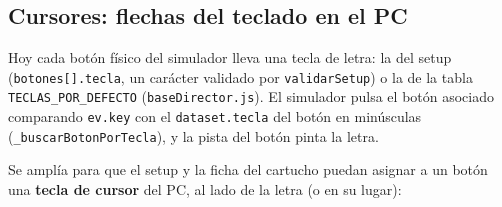 \subsection{Cursores: flechas del teclado en el PC}
\label{sec:F5I17Flechas}

Hoy cada botón físico del simulador lleva una tecla de letra: la del setup (\texttt{botones[].tecla}, un carácter validado por \texttt{validarSetup}) o la de la tabla \texttt{TECLAS\_POR\_DEFECTO} (\texttt{baseDirector.js}). El simulador pulsa el botón asociado comparando \texttt{ev.key} con el \texttt{dataset.tecla} del botón en minúsculas (\texttt{\_buscarBotonPorTecla}), y la pista del botón pinta la letra.

Se amplía para que el setup y la ficha del cartucho puedan asignar a un botón una \textbf{tecla de cursor} del PC, al lado de la letra (o en su lugar):


